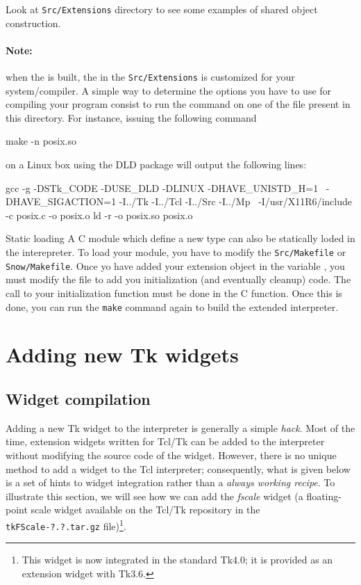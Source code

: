 \documentclass[10pt]{article}
\begin{document}
{\begin{Lentry}
Look at {\tt Src/Extensions} directory to see some examples of shared
object construction.

\paragraph*{Note:} when the {\stk} is built, the   in
the {\tt Src/Extensions} is customized for your system/compiler. A
simple way to determine the options you have to use for compiling your
program consist to run the  command on one of the file present in
this directory. For instance, issuing the following command
\begin{Code}
\begin{listing}[200]{2}
make -n posix.so
\end{listing}
\end{Code}
on a Linux box using the DLD package will output the following lines:
\begin{Code}
\begin{listing}[200]{2}
gcc  -g -DSTk_CODE -DUSE_DLD -DLINUX   -DHAVE_UNISTD_H=1 \
        -DHAVE_SIGACTION=1 -I../Tk -I../Tcl -I../Src -I../Mp \
        -I/usr/X11R6/include  -c posix.c -o posix.o
ld -r -o posix.so posix.o
\end{listing}
\end{Code}

\item [Static loading]
A C module which define a new type can also be statically loded in the
interepreter. To load your module, you have to modify the {\tt Src/Makefile}
or {\tt  Snow/Makefile}. Once yo have added your extension object in
the \Indextt{USER\_OBJ} variable , you must modify the file
\Indextt{Src/userinit.c} to add you initialization (and eventually
cleanup) code. The call to your initialization function must be done in
the \Indextt{STk\_user\_init} C function. Once this is done, you can
run the {\tt make} command again to build the extended interpreter.
\end{Lentry}

\section{Adding new Tk widgets}

\subsection{Widget compilation}

Adding a new Tk widget to the {\stk} interpreter is generally a simple
{\em hack}. Most of the time, extension widgets written
for Tcl/Tk can be added to the {\stk} interpreter without modifying
the source code of the widget. However, there is no unique method to
add a widget to the Tcl interpreter; consequently, what is given below
is a set of hints to widget integration rather than a {\em always
working recipe}. To illustrate this section, we will see how we can add
the {\em fscale} widget (a floating-point scale widget available on the
Tcl/Tk repository in the {\tt tkFScale-?.?.tar.gz} file)\footnote{
This widget is now integrated in the standard Tk4.0; it is provided as
an extension widget with Tk3.6.}.

}
\end{document}
